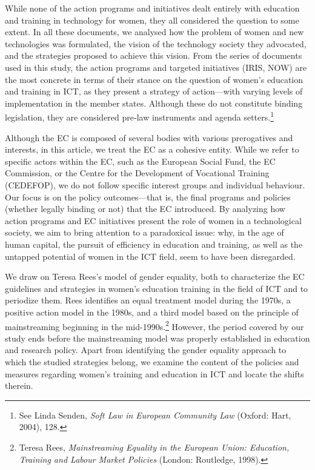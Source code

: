 \documentclass{tufte-handout}
\begin{document}
While none of the action programs and initiatives dealt entirely with
education and training in technology for women, they all considered the
question to some extent. In all these documents, we analysed how the
problem of women and new technologies was formulated, the vision of the
technology society they advocated, and the strategies proposed to
achieve this vision. From the series of documents used in this study,
the action programs and targeted initiatives (IRIS, NOW) are the most
concrete in terms of their stance on the question of women's education
and training in ICT, as they present a strategy of action---with varying
levels of implementation in the member states. Although these do not
constitute binding legislation, they are considered pre-law instruments
and agenda setters.\footnote{See Linda Senden, \emph{Soft Law in
  European Community Law} (Oxford: Hart, 2004), 128.}

Although the EC is composed of several bodies with various prerogatives
and interests, in this article, we treat the EC as a cohesive entity.
While we refer to specific actors within the EC, such as the European
Social Fund, the EC Commission, or the Centre for the Development of
Vocational Training (CEDEFOP), we do not follow specific interest groups
and individual behaviour. Our focus is on the policy outcomes---that is,
the final programs and policies (whether legally binding or not) that
the EC introduced. By analyzing how action programs and EC initiatives
present the role of women in a technological society, we aim to bring
attention to a paradoxical issue: why, in the age of human capital, the
pursuit of efficiency in education and training, as well as the untapped
potential of women in the ICT field, seem to have been disregarded.

We draw on Teresa Rees's model of gender equality, both to characterize
the EC guidelines and strategies in women's education training in the
field of ICT and to periodize them. Rees identifies an equal treatment
model during the 1970s, a positive action model in the 1980s, and a
third model based on the principle of mainstreaming beginning in the
mid-1990s.\footnote{Teresa Rees, \emph{Mainstreaming Equality in the
  European Union: Education, Training and Labour Market Policies}
  (London: Routledge, 1998).} However, the period covered by our study
ends before the mainstreaming model was properly established in
education and research policy. Apart from identifying the gender
equality approach to which the studied strategies belong, we examine the
content of the policies and measures regarding women's training and
education in ICT and locate the shifts therein.
\end{document}
